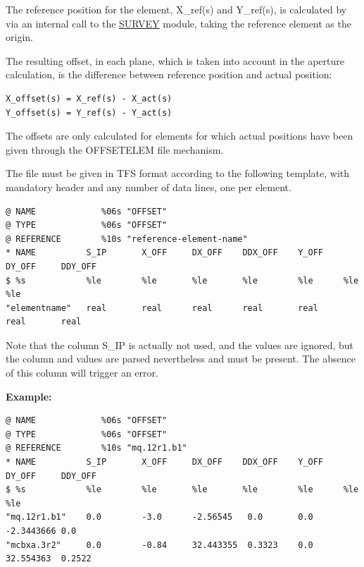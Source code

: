 The reference position for the element, X\_ref(s) and Y\_ref(s), is calculated 
by \madx via an internal call to the \href{../survey/survey.html}{SURVEY}
module, taking the reference element as the origin. 

The resulting offset, in each plane, which is taken into account in the aperture calculation, 
is the difference between reference position and actual position: 
\begin{verbatim}
X_offset(s) = X_ref(s) - X_act(s) 
Y_offset(s) = Y_ref(s) - Y_act(s)
\end{verbatim} 

The offsets are only calculated for elements for which actual positions 
have been given through the OFFSETELEM file mechanism. 

The file must be given in TFS format according to the following template, 
with mandatory header and any number of data lines, one per element. 

\begin{verbatim}
@ NAME             %06s "OFFSET" 
@ TYPE             %06s "OFFSET" 
@ REFERENCE        %10s "reference-element-name" 
* NAME          S_IP       X_OFF     DX_OFF    DDX_OFF    Y_OFF    DY_OFF     DDY_OFF
$ %s            %le        %le       %le       %le        %le      %le        %le
"elementname"	real       real      real      real       real     real       real
\end{verbatim}

Note that the column S\_IP is actually not used, and the values are ignored, 
but the column and values are parsed nevertheless and must be present. 
The absence of this column will trigger an error. 

{\bf Example:}
\begin{verbatim}
@ NAME             %06s "OFFSET" 
@ TYPE             %06s "OFFSET" 
@ REFERENCE        %10s "mq.12r1.b1" 
* NAME          S_IP       X_OFF     DX_OFF    DDX_OFF    Y_OFF    DY_OFF     DDY_OFF
$ %s            %le        %le       %le       %le        %le      %le        %le
"mq.12r1.b1"	0.0        -3.0      -2.56545   0.0       0.0      -2.3443666 0.0
"mcbxa.3r2"     0.0        -0.84     32.443355  0.3323    0.0      32.554363  0.2522
\end{verbatim}


